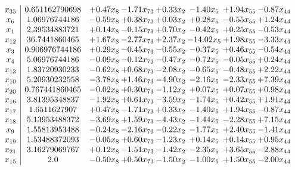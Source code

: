 \documentclass[8pt]{article}
\begin{document}
\[\begin{array}{c| c c@{\hskip 2pt} c@{\hskip 2pt} c@{\hskip 2pt} c@{\hskip 2pt} c@{\hskip 2pt} c@{\hskip 2pt} }
 x_{35}   &  0.651162790698 & +  0.47 x_{8} & -1.71 x_{73} & +  0.33 x_{2} & -1.40 x_{5} & +  1.94 x_{55} & -0.87 x_{44}\\
 x_{6}   &  1.06976744186 & -0.59 x_{8} & +  0.38 x_{73} & +  0.03 x_{2} & +  0.28 x_{5} & -0.55 x_{55} & +  1.24 x_{44}\\
 x_{1}   &  2.39534883721 & +  0.14 x_{8} & -0.15 x_{73} & +  0.70 x_{2} & -0.42 x_{5} & +  0.25 x_{55} & -0.53 x_{44}\\
 x_{12}   &  36.7441860465 & +  1.67 x_{8} & -2.77 x_{73} & +  2.37 x_{2} & -14.02 x_{5} & +  1.98 x_{55} & -3.33 x_{44}\\
 x_{3}   &  0.906976744186 & +  0.29 x_{8} & -0.45 x_{73} & -0.55 x_{2} & -0.37 x_{5} & +  0.46 x_{55} & -0.54 x_{44}\\
 x_{4}   &  5.06976744186 & -0.09 x_{8} & -0.12 x_{73} & -0.47 x_{2} & -0.72 x_{5} & -0.05 x_{55} & +  0.24 x_{44}\\
 x_{13}   &  1.83720930233 & -0.62 x_{8} & +  0.68 x_{73} & -2.08 x_{2} & -0.65 x_{5} & -0.48 x_{55} & +  2.22 x_{44}\\
 x_{10}   &  5.20930232558 & -3.78 x_{8} & +  1.46 x_{73} & -4.90 x_{2} & -2.16 x_{5} & -2.33 x_{55} & +  7.39 x_{44}\\
 x_{20}   &  0.767441860465 & -0.02 x_{8} & +  0.30 x_{73} & -1.12 x_{2} & +  0.07 x_{5} & +  0.07 x_{55} & +  0.98 x_{44}\\
 x_{16}   &  3.81395348837 & -1.92 x_{8} & +  0.61 x_{73} & -3.59 x_{2} & -1.74 x_{5} & +  0.42 x_{55} & +  1.91 x_{44}\\
 x_{17}   &  1.6511627907 & +  0.47 x_{8} & -1.71 x_{73} & +  0.33 x_{2} & -1.40 x_{5} & +  1.94 x_{55} & -0.87 x_{44}\\
 x_{18}   &  5.13953488372 & -3.69 x_{8} & +  1.59 x_{73} & -4.43 x_{2} & -1.44 x_{5} & -2.28 x_{55} & +  7.15 x_{44}\\
 x_{9}   &  1.55813953488 & -0.24 x_{8} & -2.16 x_{73} & -0.22 x_{2} & -1.77 x_{5} & +  2.40 x_{55} & -1.41 x_{44}\\
 x_{19}   &  1.53488372093 & -0.05 x_{8} & +  0.60 x_{73} & -1.23 x_{2} & +  0.14 x_{5} & +  0.14 x_{55} & +  0.95 x_{44}\\
 x_{21}   &  3.16279069767 & +  0.12 x_{8} & -1.51 x_{73} & -1.42 x_{2} & -2.35 x_{5} & +  3.65 x_{55} & -2.88 x_{44}\\
 x_{15}   &  2.0 & -0.50 x_{8} & +  0.50 x_{73} & -1.50 x_{2} & -1.00 x_{5} & +  1.50 x_{55} & -2.00 x_{44}\\

\end{array}\]
\end{document}
